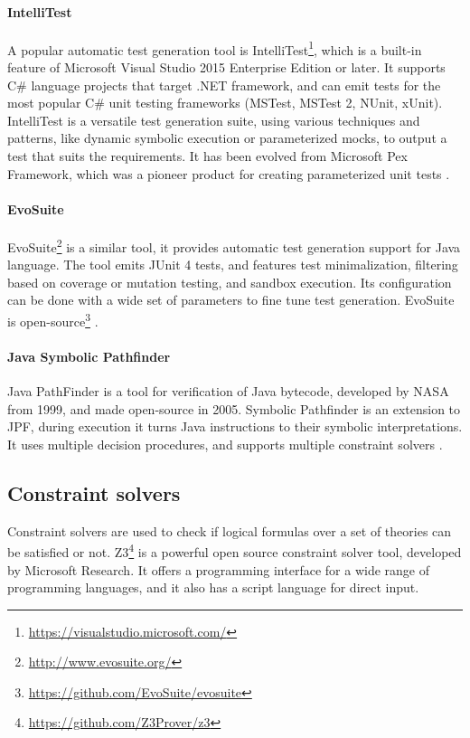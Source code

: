 \paragraph{IntelliTest}
A popular automatic test generation tool is IntelliTest\footnote{\url{https://visualstudio.microsoft.com/}}, which is a built-in feature of Microsoft Visual Studio 2015 Enterprise Edition or later. It supports C\# language projects that target .NET framework, and can emit tests for the most popular C\# unit testing frameworks (MSTest, MSTest 2, NUnit, xUnit). IntelliTest is a versatile test generation suite, using various techniques and patterns, like dynamic symbolic execution or parameterized mocks, to output a test that suits the requirements. It has been evolved from Microsoft Pex Framework, which was a pioneer product for creating parameterized unit tests \cite{advances-in-unit-testing-theory-and-practice, intellitest_manual}.  
\paragraph{EvoSuite}
EvoSuite\footnote{\url{http://www.evosuite.org/}} is a similar tool, it provides automatic test generation support for Java language. The tool emits JUnit 4 tests, and features test minimalization, filtering based on coverage or mutation testing, and sandbox execution. Its configuration can be done with a wide set of parameters to fine tune test generation. EvoSuite is open-source\footnote{\url{https://github.com/EvoSuite/evosuite}}  \cite{aron_autom}.
\paragraph{Java Symbolic Pathfinder}
Java PathFinder is a tool for verification of Java bytecode, developed by NASA from 1999, and made open-source in 2005. Symbolic Pathfinder is an extension to JPF, during execution it turns Java instructions to their symbolic interpretations. It uses multiple decision procedures, and supports multiple constraint solvers \cite{Pasareanu2013SymbolicPI}.

\subsection{Constraint solvers}
Constraint solvers are used to check if logical formulas over a set of theories can be satisfied or not. Z3\footnote{\url{https://github.com/Z3Prover/z3}} is a powerful open source constraint solver tool, developed by Microsoft Research. It offers a programming interface for a wide range of programming languages, and it also has a script language for direct input.

